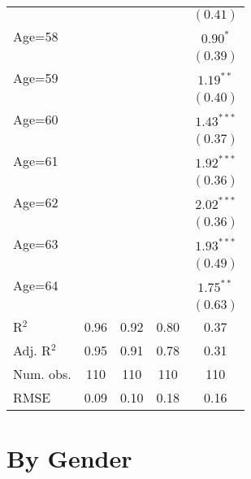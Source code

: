 \documentclass[fullpage]{paper}
\begin{document}
\begin{center}
\begin{longtable}{l c c c c }
            &               &               &               & $(0.41)$      \\
Age=58      &               &               &               & $0.90^{*}$    \\
            &               &               &               & $(0.39)$      \\
Age=59      &               &               &               & $1.19^{**}$   \\
            &               &               &               & $(0.40)$      \\
Age=60      &               &               &               & $1.43^{***}$  \\
            &               &               &               & $(0.37)$      \\
Age=61      &               &               &               & $1.92^{***}$  \\
            &               &               &               & $(0.36)$      \\
Age=62      &               &               &               & $2.02^{***}$  \\
            &               &               &               & $(0.36)$      \\
Age=63      &               &               &               & $1.93^{***}$  \\
            &               &               &               & $(0.49)$      \\
Age=64      &               &               &               & $1.75^{**}$   \\
            &               &               &               & $(0.63)$      \\
\hline
R$^2$       & 0.96          & 0.92          & 0.80          & 0.37          \\
Adj. R$^2$  & 0.95          & 0.91          & 0.78          & 0.31          \\
Num. obs.   & 110           & 110           & 110           & 110           \\
RMSE        & 0.09          & 0.10          & 0.18          & 0.16          \\
\end{longtable}
\end{center}
\section{ By Gender }
\end{document}
